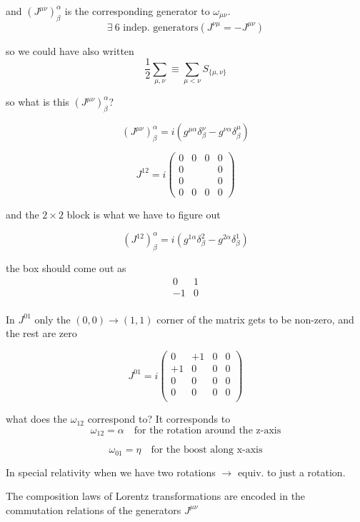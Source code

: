 \documentclass[11pt]{article}
\begin{document}
and $(J^{\mu\nu})^\alpha_\beta$ is the corresponding generator to $\omega_{\mu\nu}$. \[ \exists\ \text{6  indep. generators} (J^{\nu\mu} = - J^{\mu\nu})\]


so we could have also written \[ \frac{1}{2} \sum_{\mu,\nu} \equiv \sum_{\mu < \nu} S_{\{\mu, \nu\}}\]	


so what is this $(J^{\mu\nu})^\alpha_\beta$?

\[ (J^{\mu\nu})^\alpha_\beta = i(g^{\mu\alpha} \delta ^\nu_\beta - g^{\nu\alpha} \delta^\mu_\beta) \]

\[ J^{12} = i \begin{pmatrix}
	0 & 0 & 0 & 0\\
	0 & & &0\\
	0 & & & 0\\
	0 & 0 & 0 & 0
\end{pmatrix}\]

and the $2\times2$ block is what we have to figure out

\[ (J^{12})^\alpha_\beta =
 i(g^{1\alpha} \delta^{2}_{\beta} - g^{2\alpha} \delta^1_\beta )\]
 
 
 the box should come out as \[\begin{matrix}
 	0 & 1 \\
 	-1 & 0\\
 \end{matrix}\]
 
 
 In $ J^{01}$ only the $(0, 0) \rightarrow (1, 1)$ corner of the matrix gets to be non-zero, and the rest are zero
 
 \[ J^{01} = i \begin{pmatrix}
 	0 & +1 & 0 & 0\\
 	+1 & 0 & 0 & 0\\
 	0 & 0 & 0& 0\\
 	0 & 0 & 0& 0\\
 \end{pmatrix}\]
 
 
 what does the $\omega_{12}$ correspond to? It corresponds to \[\omega_{12} = \alpha \quad \text{for the rotation around the z-axis}\]
 
 \vspace{-16pt}
 \[ \omega_{01} = \eta \quad \text{for the boost along x-axis}\]
 
 In special relativity when we have two rotations $\rightarrow$ equiv. to just a rotation.
 
 The composition laws of Lorentz transformations are encoded in the commutation relations of the generators $J^{\mu\nu}$
 
\end{document}
